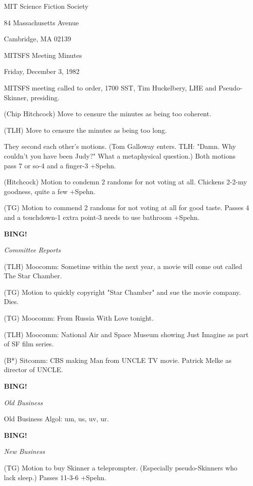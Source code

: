 \documentclass[12pt]{article}
\newcommand{\bing}{{\bf BING!} }
\newcommand{\goto}[1]{\bing \vskip 12pt \centerline{{\em{#1}}}}
\begin{document}
\begin{center}

MIT Science Fiction Society 

84 Massachusetts Avenue

Cambridge, MA 02139

\vspace{12pt}

MITSFS Meeting Minutes 

Friday, December 3, 1982

\end{center}
 
\vspace{18pt}

\setlength{\parskip}{6pt}

\noindent
MITSFS meeting called to order, 1700 SST,
Tim Huckelbery, LHE and Pseudo-Skinner, presiding.

(Chip Hitchcock) Move to censure the minutes as being too coherent.

(TLH) Move to censure the minutes as being too long.

They second each other's motions. (Tom Galloway enters. TLH: "Damn. Why couldn't you have been Judy?" What a metaphysical question.) Both motions pass 7 or so-4 and a finger-3 +Spehn.

(Hitchcock) Motion to condemn 2 randoms for not voting at all. Chickens 2-2-my goodness, quite a few +Spehn.

(TG) Motion to commend 2 randoms for not voting at all for good taste. Passes 4 and a touchdown-1 extra point-3 needs to use bathroom +Spehn.

\goto{Committee Reports}

(TLH) Moocomm: Sometime within the next year, a movie will come out called The Star Chamber.

(TG) Motion to quickly copyright "Star Chamber" and sue the movie company. Dies.

(TG) Moocomm: From Russia With Love tonight.

(TLH) Moocomm: National Air and Space Museum showing Just Imagine as part of SF film series.

(B*) Sitcomm: CBS making Man from UNCLE TV movie. Patrick Melke as director of UNCLE.

\goto{Old Business}

Old Business Algol: um, us, uv, ur.

\goto{New Business}

(TG) Motion to buy Skinner a teleprompter. (Especially pseudo-Skinners who lack sleep.) Passes 11-3-6 +Spehn.
\end{document}
